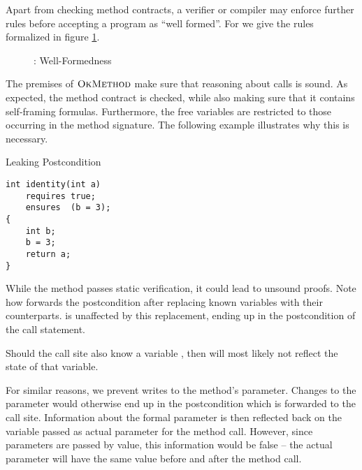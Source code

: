 Apart from checking method contracts, a verifier or compiler may enforce further rules before accepting a program as “well formed”.
For \svlidf we give the rules formalized in figure \ref{fig:idf-wf}.

\begin{figure}[h]
    
    \caption{\svlidf: Well-Formedness}
    \label{fig:idf-wf}
\end{figure}

The premises of $\textup{\textsc{OkMethod}}$ make sure that reasoning about calls is sound.
As expected, the method contract is checked, while also making sure that it contains self-framing formulas.
Furthermore, the free variables are restricted to those occurring in the method signature.
The following example illustrates why this is necessary.

\begin{example}{Leaking Postcondition}
\begin{lstlisting}
int identity(int a)
    requires true;
    ensures  (b = 3);
{
    int b;
    b = 3;
    return a;
}
\end{lstlisting}
While the method passes static verification, it could lead to unsound proofs.
Note how  forwards the postcondition after replacing known variables with their counterparts.
 is unaffected by this replacement, ending up in the postcondition of the call statement.

Should the call site also know a variable , then  will most likely not reflect the state of that variable.
\end{example}

For similar reasons, we prevent writes to the method's parameter.
Changes to the parameter would otherwise end up in the postcondition which is forwarded to the call site.
Information about the formal parameter is then reflected back on the variable passed as actual parameter for the method call.
However, since parameters are passed by value, this information would be false -- the actual parameter will have the same value before and after the method call.
